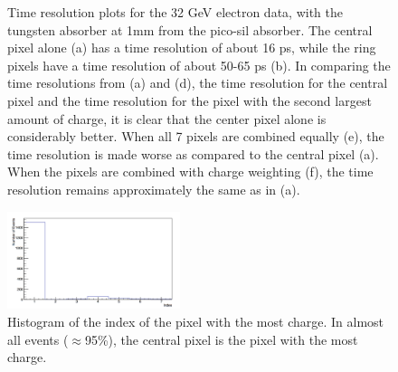 \documentclass[twocolumn,aps,prd,reprint]{revtex4-1}
\begin{document}
\begin{figure}[!htbp]
\caption{Time resolution plots for the 32 GeV electron data, with the tungsten absorber at 1mm from the pico-sil absorber. The central pixel alone (a) has a time resolution of about 16 ps, while the ring pixels have a time resolution of about 50-65 ps (b). In comparing the time resolutions from (a) and (d), the time resolution for the central pixel and the time resolution for the pixel with the second largest amount of charge, it is clear that the center pixel alone is considerably better. When all 7 pixels are combined equally (e), the time resolution is made worse as compared to the central pixel (a). When the pixels are combined with charge weighting (f), the time resolution remains approximately the same as in (a).}
\label{pixel TOF 1mm}
\end{figure}

\begin{figure}
\includegraphics[width = 0.45\textwidth]{MaxIndex}
\caption{Histogram of the index of the pixel with the most charge. In almost all events ($\approx$95\%), the central pixel is the pixel with the most charge.}
\label{pixel order charge}
\end{figure}
\end{document}
